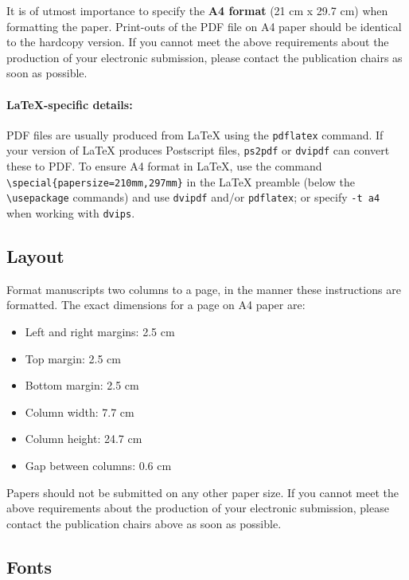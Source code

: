 \documentclass[11pt,a4paper]{article}
\begin{document}
It is of utmost importance to specify the \textbf{A4 format} (21 cm x 29.7 cm) when formatting the paper.
Print-outs of the PDF file on A4 paper should be identical to the hardcopy version.
If you cannot meet the above requirements about the production of your electronic submission, please contact the publication chairs as soon as possible.

\paragraph{\LaTeX-specific details:}
PDF files are usually produced from \LaTeX{} using the \texttt{\small pdflatex} command.
If your version of \LaTeX{} produces Postscript files, \texttt{\small ps2pdf} or \texttt{\small dvipdf} can convert these to PDF.
To ensure A4 format in \LaTeX, use the command {\small\verb|\special{papersize=210mm,297mm}|}
in the \LaTeX{} preamble (below the {\small\verb|\usepackage|} commands) and use \texttt{\small dvipdf} and/or \texttt{\small pdflatex}; or specify \texttt{\small -t a4} when working with \texttt{\small dvips}.

\subsection{Layout}
\label{ssec:layout}

Format manuscripts two columns to a page, in the manner these
instructions are formatted.
The exact dimensions for a page on A4 paper are:

\begin{itemize}
  \item Left and right margins: 2.5 cm
  \item Top margin: 2.5 cm
  \item Bottom margin: 2.5 cm
  \item Column width: 7.7 cm
  \item Column height: 24.7 cm
  \item Gap between columns: 0.6 cm
\end{itemize}

\noindent Papers should not be submitted on any other paper size.
If you cannot meet the above requirements about the production of your electronic submission, please contact the publication chairs above as soon as possible.

\subsection{Fonts}
\end{document}
